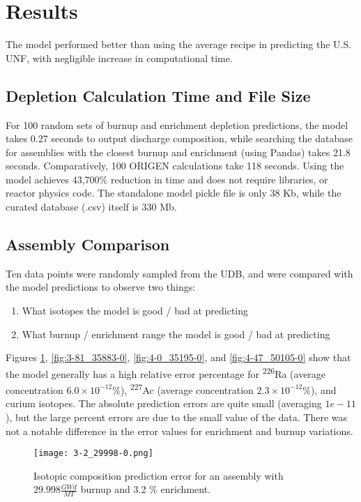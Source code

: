 \section{Results}

The model performed better than using the average
recipe in predicting the U.S. \gls{UNF}, with
negligible increase in computational time.

\subsection{Depletion Calculation Time and File Size}
For 100 random sets of
burnup and enrichment depletion predictions,
the model takes 0.27 seconds to output discharge composition, while
searching the database for assemblies
with the closest burnup and enrichment (using Pandas)
takes 21.8 seconds. Comparatively, 100 \gls{ORIGEN} calculations
take 118 seconds. Using the model achieves 43,700\% reduction
in time and does not require libraries, or reactor physics code.
The standalone model pickle file is only
38 Kb, while the curated database (.csv) itself is 330 Mb.

\subsection{Assembly Comparison}

Ten data points were randomly sampled from the \gls{UDB},
and were compared with the model predictions to observe
two things:
\begin{enumerate}
    \item What isotopes the model is good / bad
        at predicting
    \item What burnup / enrichment range the model is good / bad
        at predicting
\end{enumerate}

Figures \ref{fig:3-2_29998-0}, \ref{fig:3-81_35883-0},
\ref{fig:4-0_35195-0}, and \ref{fig:4-47_50105-0}
show that the model
generally has a high relative error percentage for \textsuperscript{226}Ra
(average concentration $6.0\times10^{-12}\%$),
\textsuperscript{227}Ac (average concentration  $2.3\times10^{-12}\%$), and curium isotopes.
The absolute prediction errors are quite small
(averaging $1e-11$), but the large percent errors are due
to the small value of the data. There was not a notable
difference in the error values for enrichment
and burnup variations.

\begin{figure}
    \centering
    \texttt{[image: 3-2\_29998-0.png]}
    \caption{Isotopic composition prediction error for an assembly with 
             $29.998 \frac{GWd}{MT}$ burnup and 3.2  \% enrichment.}
    \label{fig:3-2_29998-0}
\end{figure}

